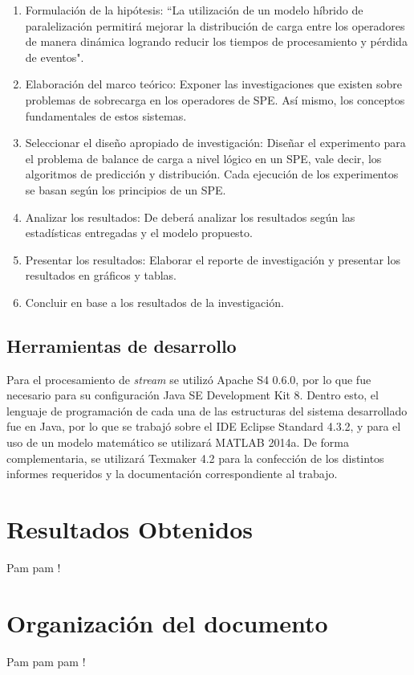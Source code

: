 \begin{enumerate}
	\item Formulación de la hipótesis: ``La utilización de un modelo híbrido de paralelización permitirá mejorar la distribución de carga entre los operadores de manera dinámica logrando reducir los tiempos de procesamiento y pérdida de eventos".
	\item Elaboración del marco teórico: Exponer las investigaciones que existen sobre problemas de sobrecarga en los operadores de SPE. Así mismo, los conceptos fundamentales de estos sistemas.
	\item Seleccionar el diseño apropiado de investigación: Diseñar el experimento para el problema de balance de carga a nivel lógico en un SPE, vale decir, los algoritmos de predicción y distribución. Cada ejecución de los experimentos se basan según los principios de un SPE.
	\item Analizar los resultados: De deberá analizar los resultados según las estadísticas entregadas y el modelo propuesto.
	\item Presentar los resultados: Elaborar el reporte de investigación y presentar los resultados en gráficos y tablas.
	\item Concluir en base a los resultados de la investigación.
\end{enumerate}

\subsection{Herramientas de desarrollo}
Para el procesamiento de \textsl{stream} se utilizó Apache S4 0.6.0, por lo que fue necesario para su configuración Java SE Development Kit 8. Dentro esto, el lenguaje de programación de cada una de las estructuras del sistema desarrollado fue en Java, por lo que se trabajó sobre el IDE Eclipse Standard 4.3.2, y para el uso de un modelo matemático se utilizará MATLAB 2014a. De forma complementaria, se utilizará Texmaker 4.2 para la confección de los distintos informes requeridos y la documentación correspondiente al trabajo.

\section{Resultados Obtenidos}
\label{intro:resultados}
Pam pam !

\section{Organización del documento}
\label{intro:organizacion}
Pam pam pam !

